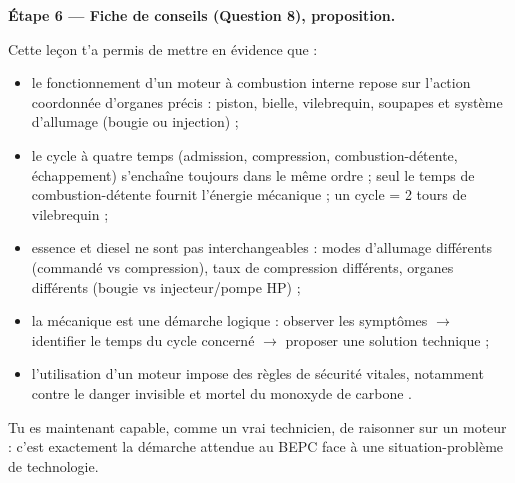 \documentclass[11pt]{article}
\newcounter{popsec}
\newcounter{popsub}
\newcommand{\courssub}[1]{%
  \stepcounter{popsub}%
  \par\vspace{9pt}\noindent{\popxbold\fontsize{11.5}{13}\selectfont\color{popink}{\color{poporange}\thepopsec.\thepopsub}\hspace{6pt}#1}\par\nopagebreak\vspace{4pt}
}
\begin{document}
\textbf{Étape 6 — Fiche de conseils (Question 8), proposition.}
\begin{center}
\end{center}

\courssub{Bilan de la leçon}
Cette leçon t'a permis de mettre en évidence que :
\begin{itemize}
\item le fonctionnement d'un moteur à combustion interne repose sur l'action coordonnée d'organes précis : piston, bielle, vilebrequin, soupapes et système d'allumage (bougie ou injection) ;
\item le cycle à quatre temps (admission, compression, combustion-détente, échappement) s'enchaîne toujours dans le même ordre ; seul le temps de combustion-détente fournit l'énergie mécanique ; un cycle = 2 tours de vilebrequin ;
\item essence et diesel ne sont pas interchangeables : modes d'allumage différents (commandé vs compression), taux de compression différents, organes différents (bougie vs injecteur/pompe HP) ;
\item la mécanique est une démarche logique : observer les symptômes $\rightarrow$ identifier le temps du cycle concerné $\rightarrow$ proposer une solution technique ;
\item l'utilisation d'un moteur impose des règles de sécurité vitales, notamment contre le danger invisible et mortel du monoxyde de carbone .
\end{itemize}
Tu es maintenant capable, comme un vrai technicien, de raisonner sur un moteur : c'est exactement la démarche attendue au BEPC face à une situation-problème de technologie.
\end{document}
